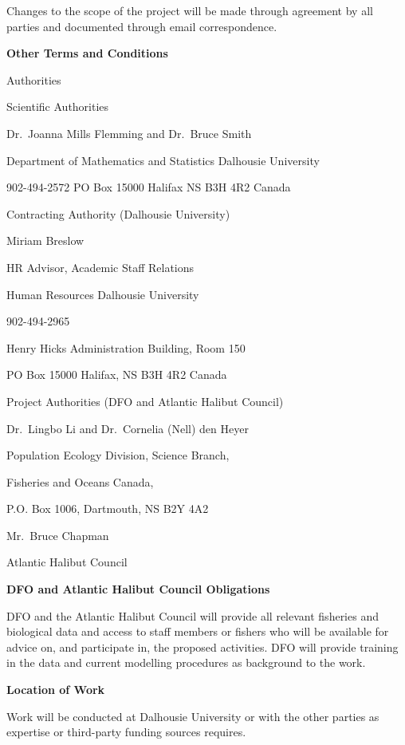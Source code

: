 \documentclass[12pt]{article}\usepackage[]{graphicx}\usepackage[]{color}
\begin{document}
\begin{appendices}
Changes to the scope of the project will be made through agreement by all parties and documented through email correspondence.

\textbf{Other Terms and Conditions}

Authorities

Scientific Authorities

Dr.~Joanna Mills Flemming and Dr.~Bruce Smith

Department of Mathematics and Statistics \textbar{} Dalhousie University

902-494-2572 PO Box 15000 \textbar{} Halifax NS B3H 4R2 Canada

Contracting Authority (Dalhousie University)

Miriam Breslow

HR Advisor, Academic Staff Relations

Human Resources \textbar{} Dalhousie University

902-494-2965

Henry Hicks Administration Building, Room 150

PO Box 15000 \textbar{} Halifax, NS B3H 4R2 Canada

Project Authorities (DFO and Atlantic Halibut Council)

Dr.~Lingbo Li and Dr.~Cornelia (Nell) den Heyer

Population Ecology Division, Science Branch,

Fisheries and Oceans Canada,

P.O. Box 1006, Dartmouth, NS B2Y 4A2


Mr.~Bruce Chapman

Atlantic Halibut Council


\textbf{DFO and Atlantic Halibut Council Obligations}

DFO and the Atlantic Halibut Council will provide all relevant fisheries and biological data and access to staff members or fishers who will be available for advice on, and participate in, the proposed activities. DFO will provide training in the data and current modelling procedures as background to the work.

\textbf{Location of Work}

Work will be conducted at Dalhousie University or with the other parties as expertise or third-party funding sources requires.


\end{appendices}
\end{document}
